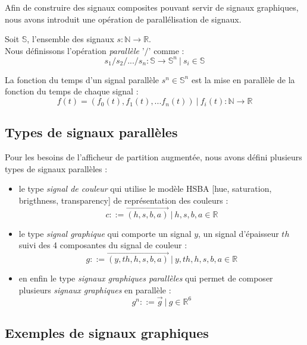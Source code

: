 \documentclass{article}
\begin{document}
Afin de construire des signaux composites pouvant servir de signaux graphiques, nous avons introduit une opération de parallélisation de signaux.

Soit $\mathbb{S}$, l'ensemble des signaux $s : \mathbb{N} \rightarrow \mathbb{R}$. \\
Nous définissons l'opération \emph{parallèle} '$/$' comme :
\begin{equation}
s_{1} / s_{2} / ... / s_{n} : \mathbb{S} \rightarrow \mathbb{S}^n\ |\ s_i \in \mathbb{S}
\end{equation}

La fonction du temps d'un signal parallèle  $s^n \in \mathbb{S}^n$ est la mise en parallèle de la fonction du temps de chaque signal : %
\begin{equation}
f(t) = (f_0(t), f_1(t), ... f_n(t))\ |\ f_i(t) :  \mathbb{N} \rightarrow \mathbb{R}
\end{equation}


\subsection{Types de signaux parallèles}
Pour les besoins de l'afficheur de partition augmentée, nous avons défini plusieurs types de signaux parallèles :
\begin{itemize}
	\item le type \emph{signal de couleur} qui utilise le modèle HSBA [hue, saturation, brigthness, transparency] 
	de représentation des couleurs :
	\[c ::= \overrightarrow{(h, s , b, a)} \ |\  h, s , b, a \in \mathbb{R}\] 
	\item le type \emph{signal graphique} qui comporte un signal $y$, un signal d'épaisseur $th$
	 suivi des 4 composantes du signal de couleur :
	\[g ::= \overrightarrow{(y, th, h, s , b, a)} \ |\  y, th, h, s , b, a \in \mathbb{R}\]
	\item en enfin le type \emph{signaux graphiques parallèles} qui permet de composer 
	plusieurs \emph{signaux graphiques} en parallèle :
	\[g^n ::= \overrightarrow{g} \ |\  g \in \mathbb{R}^6\]
\end{itemize}

\subsection{Exemples de signaux graphiques}
\end{document}
